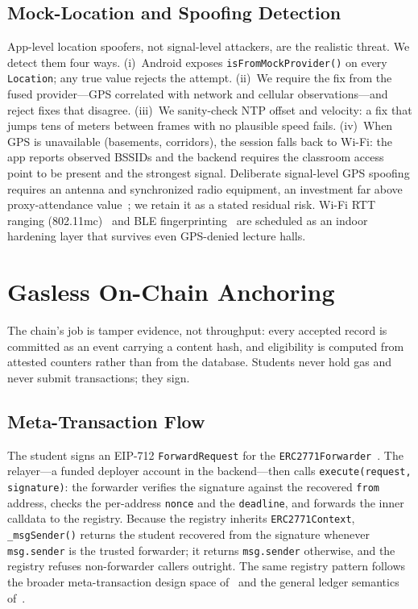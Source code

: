 \documentclass[conference]{IEEEtran}
\begin{document}
\subsection{Mock-Location and Spoofing Detection}
App-level location spoofers, not signal-level attackers, are the realistic
threat. We detect them four ways. (i)~Android exposes
\texttt{isFromMockProvider()} on every \texttt{Location}; any true value
rejects the attempt. (ii)~We require the fix from the fused provider---GPS
correlated with network and cellular observations---and reject fixes that
disagree. (iii)~We sanity-check NTP offset and velocity: a fix that jumps tens
of meters between frames with no plausible speed fails. (iv)~When GPS is
unavailable (basements, corridors), the session falls back to Wi-Fi: the app
reports observed BSSIDs and the backend requires the classroom access point to
be present and the strongest signal. Deliberate signal-level GPS spoofing
requires an antenna and synchronized radio equipment, an investment far above
proxy-attendance value~\cite{tippenhauer2011requirements,wu2020spoofing}; we
retain it as a stated residual risk. Wi-Fi RTT ranging
(802.11mc)~\cite{ma2022wifi} and BLE fingerprinting~\cite{faragher2015location,
zafari2019survey} are scheduled as an indoor hardening layer that survives
even GPS-denied lecture halls.

\section{Gasless On-Chain Anchoring}
The chain's job is tamper evidence, not throughput: every accepted record is
committed as an event carrying a content hash, and eligibility is computed
from attested counters rather than from the database. Students never hold gas
and never submit transactions; they sign.

\subsection{Meta-Transaction Flow}
The student signs an EIP-712 \texttt{ForwardRequest} for the
\texttt{ERC2771Forwarder}~\cite{eip2771}. The relayer---a funded deployer
account in the backend---then calls \texttt{execute(request, signature)}: the
forwarder verifies the signature against the recovered \texttt{from} address,
checks the per-address \texttt{nonce} and the \texttt{deadline}, and forwards
the inner calldata to the registry. Because the registry inherits
\texttt{ERC2771Context}, \texttt{\_msgSender()} returns the student recovered
from the signature whenever \texttt{msg.sender} is the trusted forwarder; it
returns \texttt{msg.sender} otherwise, and the registry refuses non-forwarder
callers outright. The same registry pattern follows the broader
meta-transaction design space of~\cite{eip2771,eip712} and the general ledger
semantics of~\cite{wood2014ethereum}.
\end{document}
